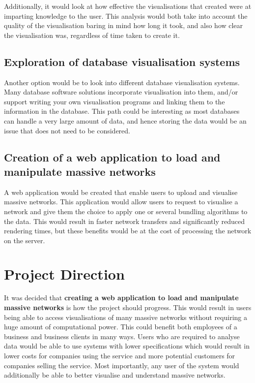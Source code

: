 \documentclass[../dissertation.tex]{subfiles}
\begin{document}
Additionally, it would look at how effective the visualisations that created were at imparting knowledge to the user. This analysis would both take into account the quality of the visualisation baring in mind how long it took, and also how clear the visualisation was, regardless of time taken to create it. 

\subsection{Exploration of database visualisation systems}

Another option would be to look into different database visualisation systems. Many database software solutions incorporate visualisation into them, and/or support writing your own visualisation programs and linking them to the information in the database. This path could be interesting as most databases can handle a very large amount of data, and hence storing the data would be an issue that does not need to be considered. 

\subsection{Creation of a web application to load and manipulate massive networks}

A web application would be created that enable users to upload and visualise massive networks. This application would allow users to request to visualise a network and give them the choice to apply one or several bundling algorithms to the data. This would result in faster network transfers and significantly reduced rendering times, but these benefits would be at the cost of processing the network on the server.

\section{Project Direction}

It was decided that \textbf{creating a web application to load and manipulate massive networks} is how the project should progress. This would result in users being able to access visualisations of many massive networks without requiring a huge amount of computational power. This could benefit both employees of a business and business clients in many ways. Users who are required to analyse data would be able to use systems with lower specifications which would result in lower costs for companies using the service and more potential customers for companies selling the service. Most importantly, any user of the system would additionally be able to better visualise and understand massive networks.
\end{document}
